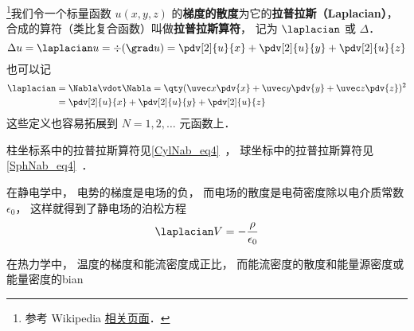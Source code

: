 
\begin{issues}
\issueDraft
\end{issues}


\footnote{参考 Wikipedia \href{https://en.wikipedia.org/wiki/Laplace_operator}{相关页面}．}我们令一个标量函数 $u(x, y, z)$ 的\textbf{梯度的散度}为它的\textbf{拉普拉斯（Laplacian）}， 合成的算符（类比复合函数）叫做\textbf{拉普拉斯算符}， 记为 $\laplacian$ 或 $\Delta$．
\begin{equation}
\Delta u = \laplacian u = \div (\grad u) = \pdv[2]{u}{x} + \pdv[2]{u}{y} + \pdv[2]{u}{z}
\end{equation}
也可以记
\begin{equation}
\begin{aligned}
\laplacian &= \Nabla \vdot \Nabla = \qty(\uvec x\pdv{x} + \uvec y\pdv{y} + \uvec z\pdv{z})^2\\
&= \pdv[2]{u}{x} + \pdv[2]{u}{y} + \pdv[2]{u}{z}
\end{aligned}
\end{equation}
这些定义也容易拓展到 $N = 1, 2, \dots$ 元函数上．

柱坐标系中的拉普拉斯算符见\autoref{CylNab_eq4}~， 球坐标中的拉普拉斯算符见\autoref{SphNab_eq4}~．

在静电学中， 电势的梯度是电场的负， 而电场的散度是电荷密度除以电介质常数 $\epsilon_0$， 这样就得到了静电场的泊松方程
\begin{equation}
\laplacian V = -\frac{\rho}{\epsilon_0}
\end{equation}

在热力学中， 温度的梯度和能流密度成正比， 而能流密度的散度和能量源密度或能量密度的bian
